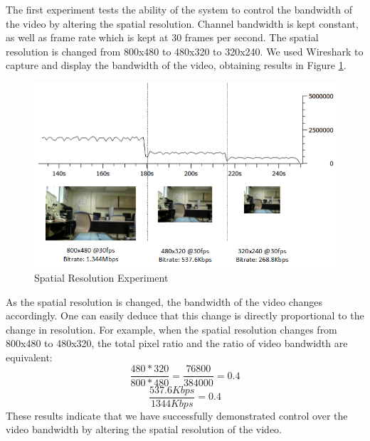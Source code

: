 The first experiment tests the ability of the system to control the bandwidth of the video by altering the spatial resolution. Channel bandwidth is kept constant, as well as frame rate which is kept at 30 frames per second. The spatial resolution is changed from 800x480 to 480x320 to 320x240. We used Wireshark to capture and display the bandwidth of the video, obtaining results in Figure \ref{fig:SpatialTest}.
\begin{figure}[H]
\centering
\includegraphics[width=0.8\linewidth]{images/SpatialResolutionTest.png}
\caption{Spatial Resolution Experiment}
\label{fig:SpatialTest}
\end{figure}
As the spatial resolution is changed, the bandwidth of the video changes accordingly. One can easily deduce that this change is directly proportional to the change in resolution. For example, when the spatial resolution changes from 800x480 to 480x320, the total pixel ratio and the ratio of video bandwidth are equivalent:
\[ \frac{480 * 320}{800 * 480} = \frac{76800}{384000} = 0.4 \]
\[ \frac{537.6Kbps}{1344Kbps} = 0.4 \]
These results indicate that we have successfully demonstrated control over the video bandwidth by altering the spatial resolution of the video. 

